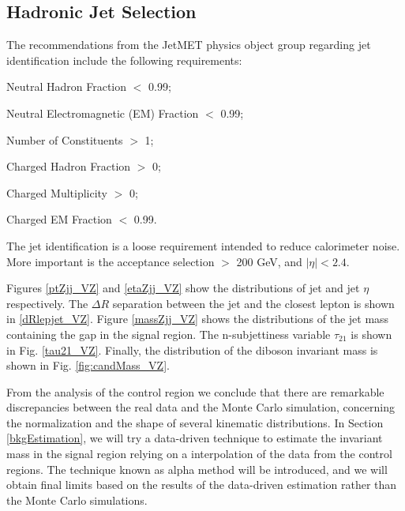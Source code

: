 \subsection{Hadronic Jet Selection}
The recommendations from the JetMET physics object group \cite{jetmetPOG} regarding jet identification include the following requirements:
\begin{compact_itemize}
\item Neutral Hadron Fraction $<$ 0.99;
\item Neutral Electromagnetic (EM) Fraction $<$ 0.99;
\item Number of Constituents $>$ 1;
\item Charged Hadron Fraction $>$ 0;
\item Charged Multiplicity $>$ 0;
\item Charged EM Fraction $<$ 0.99.
\end{compact_itemize}
The jet identification is a loose requirement intended to reduce calorimeter noise. More important is the acceptance selection \ptrans $>$ 200 GeV, and $|\eta|<2.4$.

Figures \ref{ptZjj_VZ} and \ref{etaZjj_VZ} show the distributions of jet \ptrans and jet $\eta$ respectively. The $\Delta R$ separation between the jet and the closest lepton is shown in \ref{dRlepjet_VZ}. Figure \ref{massZjj_VZ} shows the distributions of the jet mass containing the gap in the signal region. The n-subjettiness variable $\tau_{21}$ is shown in Fig. \ref{tau21_VZ}. Finally, the distribution of the diboson invariant mass is shown in Fig. \ref{fig:candMass_VZ}.

From the analysis of the control region we conclude that there are remarkable discrepancies between the real data and the Monte Carlo simulation, concerning the normalization and the shape of several kinematic distributions. In Section \ref{bkgEstimation}, we will try a data-driven technique to estimate the invariant mass in the signal region relying on a interpolation of the data from the control regions. The technique known as alpha method \cite{Mozer:2016wzi} will be introduced, and we will obtain final limits based on the results of the data-driven estimation rather than the Monte Carlo simulations.

